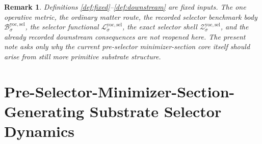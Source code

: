 \documentclass[11pt]{article}
\newcommand{\YoctoSelectorBody}[1]{\mathcal B_{#1}^{\mathrm{yoc,sel}}}
\newcommand{\YoctoSelectorFunctional}[1]{\mathscr L_{#1}^{\mathrm{yoc,sel}}}
\newcommand{\YoctoSelectorShell}[1]{\mathcal Z_{#1}^{\mathrm{yoc,sel}}}
\newtheorem{remark}{Remark}
\begin{document}
\begin{remark}
Definitions \ref{def:fixed}--\ref{def:downstream} are fixed inputs. The one operative metric, the ordinary matter route, the recorded selector benchmark body \(\YoctoSelectorBody{\sigma}\), the selector functional \(\YoctoSelectorFunctional{\sigma}\), the exact selector shell \(\YoctoSelectorShell{\sigma}\), and the already recorded downstream consequences are not reopened here. The present note asks only why the current pre-selector minimizer-section core itself should arise from still more primitive substrate structure.
\end{remark}

\section{Pre-Selector-Minimizer-Section-Generating Substrate Selector Dynamics}
\end{document}
